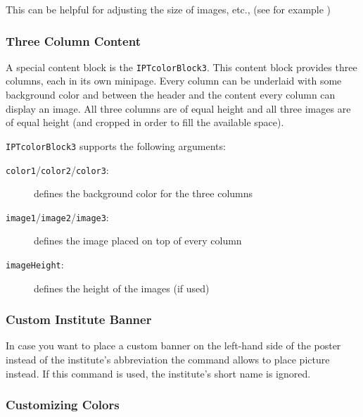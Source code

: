 This can be helpful for adjusting the size of images, etc., (see for example )

\subsubsection{Three Column Content}

A special content block is the \texttt{\bs{}IPTcolorBlock3}. This content block provides three columns, each in its own minipage. Every column can be underlaid with some background color and between the header and the content every column can display an image. All three columns are of equal height and all three images are of equal height (and cropped in order to fill the available space).

\texttt{IPTcolorBlock3} supports the following arguments:
\begin{description}
	\item[\texttt{color1}/\texttt{color2}/\texttt{color3}:] defines the background color for the three columns
	\item[\texttt{image1}/\texttt{image2}/\texttt{image3}:] defines the image placed on top of every column
	\item[\texttt{imageHeight}:] defines the height of the images (if used)
\end{description}


\subsubsection{Custom Institute Banner}

In case you want to place a custom banner on the left-hand side of the poster instead of the institute's abbreviation the command \texttt{} allows to place picture instead. If this command is used, the institute's short name is ignored.


\subsubsection{Customizing Colors}

